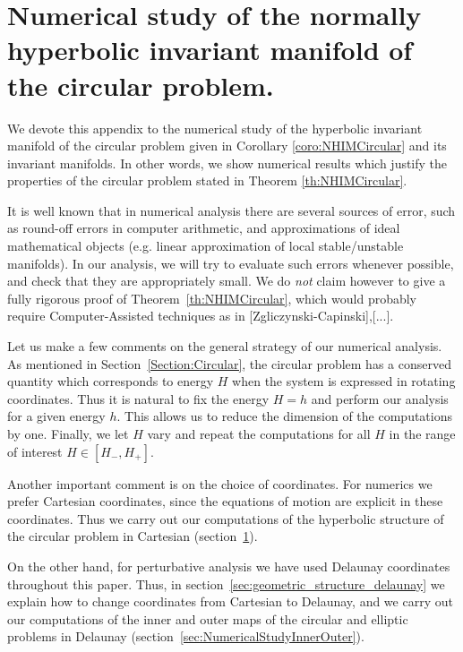 \section{Numerical study of the normally hyperbolic invariant manifold of the circular problem. }\label{app:NHIMCircular}

We devote this appendix to the numerical study of the hyperbolic
invariant manifold of the circular problem given in Corollary
\ref{coro:NHIMCircular} and its invariant manifolds. In other words,
we show numerical results which justify the properties of the circular
problem stated in Theorem \ref{th:NHIMCircular}.

It is well known that in numerical analysis there are several sources
of error, such as round-off errors in computer arithmetic, and
approximations of ideal mathematical objects (e.g. linear
approximation of local stable/unstable manifolds). 
In our analysis, we will try to evaluate such errors whenever
possible, and check that they are appropriately small.
We do \emph{not} claim however to give a fully rigorous proof of
Theorem~\ref{th:NHIMCircular}, which would probably require
Computer-Assisted techniques as in [Zgliczynski-Capinski],[...].

Let us make a few comments on the general strategy of our numerical
analysis. As mentioned in Section~\ref{Section:Circular}, the circular
 problem has a conserved quantity which corresponds to
energy $H$ when the system is expressed in rotating coordinates. 
Thus it is natural to fix the energy $H=h$ and perform our analysis for a given
energy $h$. This allows us to reduce the dimension of the computations by
one. Finally, we let $H$ vary and repeat the computations for all $H$
in the range of interest $H\in[H_-,H_+]$.

Another important comment is on the choice of coordinates.
For numerics we prefer Cartesian coordinates, since the equations of
motion are explicit in these coordinates.
Thus we carry out our computations of the hyperbolic structure of the
circular problem in Cartesian (section~\ref{app:NHIMCircular}).

On the other hand, for perturbative analysis we have used Delaunay
coordinates throughout this paper.
Thus, in section~\ref{sec:geometric_structure_delaunay} we explain how
to change coordinates from Cartesian to Delaunay, and 
we carry out our computations of the inner and outer maps of the
circular and elliptic problems in Delaunay
(section~\ref{sec:NumericalStudyInnerOuter}).


